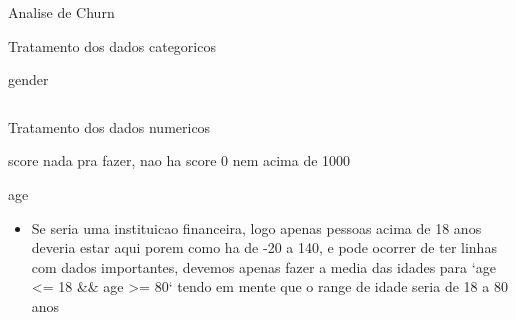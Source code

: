 \documentclass[presentation]{beamer}
\begin{document}
\begin{frame}[label={sec:org6b1fb3e},fragile]{Analise de Churn}
\begin{block}{Tratamento dos dados categoricos}
\begin{block}{gender}
\begin{verbatim}
\end{verbatim}
\end{block}
\end{block}
\begin{block}{Tratamento dos dados numericos}
\begin{block}{score}
nada pra fazer, nao ha score 0 nem acima de 1000
\end{block}
\begin{block}{age}
\begin{itemize}
\item Se seria uma instituicao financeira, logo apenas pessoas acima de 18 anos deveria estar aqui
porem como ha de -20 a 140, e pode ocorrer de ter linhas com dados importantes, devemos apenas
fazer a media das idades para `age <= 18 \&\& age >= 80` tendo em mente que o range de idade
seria de 18 a 80 anos
\end{itemize}
\end{block}
\end{block}
\end{frame}
\end{document}

